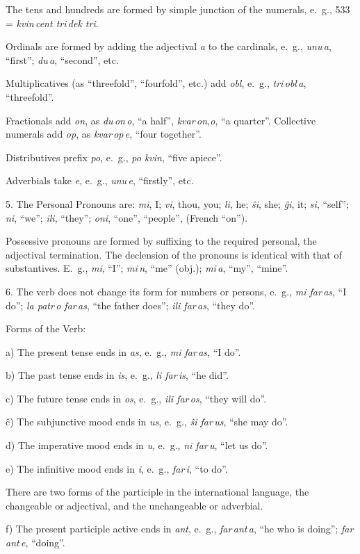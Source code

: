 The tens and hundreds are formed by simple junction of the numerals, e.~g., 533 = \emph{kvin\,cent tri\,dek tri}.

Ordinals are formed by adding the adjectival \emph{a} to the cardinals, e.~g., \emph{unu\,a}, “first”; \emph{du\,a}, “second”, etc.

Multiplicatives (as “threefold”, “fourfold”, etc.) add \emph{obl}, e.~g., \emph{tri\,obl\,a}, “threefold”.

Fractionals add \emph{on}, as \emph{du\,on\,o}, “a half”, \emph{kvar\,on,o}, “a quarter”. Collective numerals add \emph{op}, as \emph{kvar\,op\,e}, “four together”.

Distributives prefix \emph{po}, e.~g., \emph{po kvin}, “five apiece”.

Adverbials take \emph{e}, e.~g., \emph{unu\,e}, “firstly”, etc.

5. The Personal Pronouns are: \emph{mi}, I; \emph{vi}, thou, you; \emph{li}, he; \emph{ŝi}, she; \emph{ĝi}, it; \emph{si}, “self”; \emph{ni}, “we”; \emph{ili}, “they”; \emph{oni}, “one”, “people”, (French “on”).

Possessive pronouns are formed by suffixing to the required personal, the adjectival termination. The declension of the pronouns is identical with that of substantives. E.~g., \emph{mi}, “I”; \emph{mi\,n}, “me” (obj.); \emph{mi\,a}, “my”, “mine”.

6. The verb does not change its form for numbers or persons, e.~g., \emph{mi far\,as}, “I do”; \emph{la patr\,o far\,as}, “the father does”; \emph{ili far\,as}, “they do”.

Forms of the Verb:

a) The present tense ends in \emph{as}, e.~g., \emph{mi far\,as}, “I do”.

b) The past tense ends in \emph{is}, e.~g., \emph{li far\,is}, “he did”.

c) The future tense ends in \emph{os}, e.~g., \emph{ili far\,os}, “they will do”.

ĉ) The subjunctive mood ends in \emph{us}, e.~g., \emph{ŝi far\,us}, “she may do”.

d) The imperative mood ends in \emph{u}, e.~g., \emph{ni far\,u}, “let us do”.

e) The infinitive mood ends in \emph{i}, e.~g., \emph{far\,i}, “to do”.

There are two forms of the participle in the international language, the changeable or adjectival, and the unchangeable or adverbial. 

f) The present participle active ends in \emph{ant}, e.~g., \emph{far\,ant\,a}, “he who is doing”; \emph{far\,ant\,e}, “doing”.

